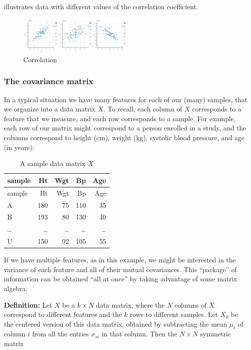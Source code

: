 \documentclass[]{article}
\begin{document}
 illustrates data with different values of the
correlation coefficient.

\begin{figure}
\hypertarget{fig:corrfig}{%
\centering
\includegraphics[width=0.5\textwidth,height=\textheight]{../img/correlation.png}
\caption{Correlation}\label{fig:corrfig}
}
\end{figure}

\hypertarget{sec:covarmat}{%
\subsubsection{The covariance matrix}\label{sec:covarmat}}

In a typical situation we have many features for each of our (many)
samples, that we organize into a data matrix \(X\). To recall, each
column of \(X\) corresponds to a feature that we measure, and each row
corresponds to a sample. For example, each row of our matrix might
correspond to a person enrolled in a study, and the columns correspond
to height (cm), weight (kg), systolic blood pressure, and age (in
years):

\begin{longtable}[]{@{}lrrrr@{}}
\caption{A sample data matrix \(X\) \label{tbl:data}}\tabularnewline
\toprule
sample & Ht & Wgt & Bp & Age\tabularnewline
\midrule
\endfirsthead
\toprule
sample & Ht & Wgt & Bp & Age\tabularnewline
\midrule
\endhead
A & 180 & 75 & 110 & 35\tabularnewline
B & 193 & 80 & 130 & 40\tabularnewline
\ldots{} & \ldots{} & \ldots{} & \ldots{} & \ldots{}\tabularnewline
U & 150 & 92 & 105 & 55\tabularnewline
\bottomrule
\end{longtable}

If we have multiple features, as in this example, we might be interested
in the variance of each feature and all of their mutual covariances.
This ``package'' of information can be obtained ``all at once'' by
taking advantage of some matrix algebra.

\textbf{Definition:} Let \(X\) be a \(k\times N\) data matrix, where the
\(N\) columns of \(X\) correspond to different features and the \(k\)
rows to different samples. Let \(X_{0}\) be the centered version of this
data matrix, obtained by subtracting the mean \(\mu_{i}\) of column
\(i\) from all the entries \(x_{si}\) in that column. Then the
\(N\times N\) symmetric matrix
\end{document}
